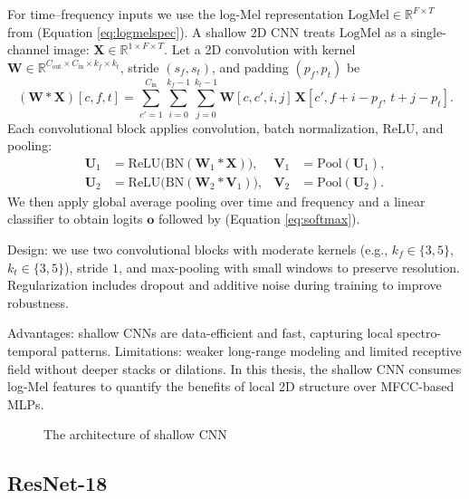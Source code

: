 For time–frequency inputs we use the log-Mel representation \(\mathrm{LogMel} \in \mathbb{R}^{F\times T}\) from (Equation \ref{eq:logmelspec}). A shallow 2D CNN treats \(\mathrm{LogMel}\) as a single-channel image: \(\mathbf{X} \in \mathbb{R}^{1\times F\times T}\). Let a 2D convolution with kernel \(\mathbf{W} \in \mathbb{R}^{C_{\text{out}} \times C_{\text{in}} \times k_f \times k_t}\), stride \((s_f,s_t)\), and padding \((p_f,p_t)\) be
\begin{equation}\label{eq:cnnconv}
(\mathbf{W} * \mathbf{X})[c,f,t] = \sum_{c'=1}^{C_{\text{in}}} \sum_{i=0}^{k_f-1} \sum_{j=0}^{k_t-1} \mathbf{W}[c,c',i,j] \, \mathbf{X}[c', f+i-p_f,\, t+j-p_t].
\end{equation}
Each convolutional block applies convolution, batch normalization, ReLU, and pooling:
\begin{align}
\mathbf{U}_1 &= \mathrm{ReLU}\big(\mathrm{BN}(\mathbf{W}_1 * \mathbf{X})\big), & \mathbf{V}_1 &= \mathrm{Pool}(\mathbf{U}_1),\\
\mathbf{U}_2 &= \mathrm{ReLU}\big(\mathrm{BN}(\mathbf{W}_2 * \mathbf{V}_1)\big), & \mathbf{V}_2 &= \mathrm{Pool}(\mathbf{U}_2).
\end{align}
We then apply global average pooling over time and frequency and a linear classifier to obtain logits \(\mathbf{o}\) followed by (Equation \ref{eq:softmax}).

Design: we use two convolutional blocks with moderate kernels (e.g., \(k_f\in\{3,5\}\), \(k_t\in\{3,5\}\)), stride \(1\), and max-pooling with small windows to preserve resolution. Regularization includes dropout and additive noise during training to improve robustness.

Advantages: shallow CNNs are data-efficient and fast, capturing local spectro-temporal patterns. Limitations: weaker long-range modeling and limited receptive field without deeper stacks or dilations. In this thesis, the shallow CNN consumes log-Mel features to quantify the benefits of local 2D structure over MFCC-based MLPs.

\begin{figure}[h!tbp]
  \centering
  \caption{The architecture of shallow CNN }
  \label{fig:shallow_cnn_arch}
  
\end{figure}

\subsection{ResNet-18}

